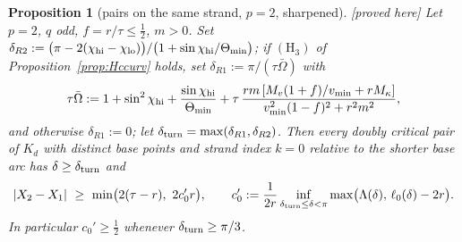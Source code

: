 \documentclass[10pt,a4paper]{article}
\theoremstyle{plain}
\newtheorem{proposition}[theorem]{Proposition}
\theoremstyle{definition}
\theoremstyle{remark}
\newcommand{\status}[1]{\textsf{\small [#1]}}
\begin{document}
\begin{proposition}[pairs on the same strand, $p=2$, sharpened]\label{prop:samestrand}\status{proved here}
Let $p=2$, $q$ odd, $f=r/\tau\le\frac12$, $m>0$. Set $\delta_{R2}:=\bigl(\pi-2(\chi_{\rm hi}-\chi_{\rm lo})\bigr)/\bigl(1+\sin\chi_{\rm hi}/\Theta_{\min}\bigr)$; if $(\mathrm H_3)$ of Proposition~\ref{prop:Hccurv} holds, set $\delta_{R1}:=\pi/(\tau\bar\Omega)$ with
\[
\tau\bar\Omega:=1+\sin^2\chi_{\rm hi}+\frac{\sin\chi_{\rm hi}}{\Theta_{\min}}+\tau\,\frac{rm\,[M_v(1+f)/v_{\min}+rM_\kappa]}{v_{\min}^2(1-f)^2+r^2m^2},
\]
and otherwise $\delta_{R1}:=0$; let $\delta_{\rm turn}=\max(\delta_{R1},\delta_{R2})$. Then every doubly critical pair of $K_d$ with distinct base points and strand index $k=0$ relative to the shorter base arc has $\delta\ge\delta_{\rm turn}$ and
\[
|X_2-X_1|\ \ge\ \min\bigl(2(\tau-r),\ 2c_0'r\bigr),\qquad c_0':=\frac1{2r}\inf_{\delta_{\rm turn}\le\delta<\pi}\max\bigl(\Lambda(\delta),\,\ell_0(\delta)-2r\bigr).
\]
In particular $c_0'\ge\frac12$ whenever $\delta_{\rm turn}\ge\pi/3$.
\end{proposition}
\end{document}
